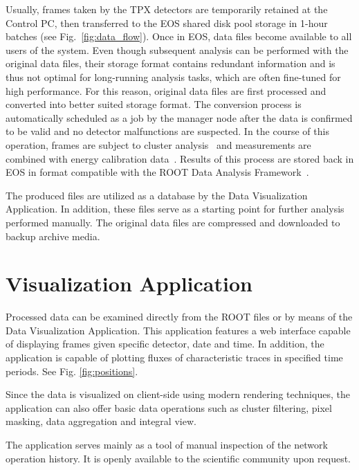 \documentclass[conference]{IEEEtran}
\begin{document}
Usually, frames taken by the TPX detectors are temporarily retained at the Control PC, then transferred to the EOS shared disk pool storage in 1-hour batches (see Fig.~\ref{fig:data_flow}). Once in EOS, data files become available to all users of the system. Even though subsequent analysis can be performed with the original data files, their storage format contains redundant information and is thus not optimal for long-running analysis tasks, which are often fine-tuned for high performance. For this reason, original data files are first processed and converted into better suited storage format. The conversion process is automatically scheduled as a job by the manager node after the data is confirmed to be valid and no detector malfunctions are suspected. In the course of this operation, frames are subject to cluster analysis~\cite{Holy2008} and measurements are combined with energy calibration data~\cite{Jakubek2011}. Results of this process are stored back in EOS in format compatible with the ROOT Data Analysis Framework~\cite{ROOT}.

The produced files are utilized as a database by the Data Visualization Application. In addition, these files serve as a starting point for further analysis performed manually. The original data files are compressed and downloaded to backup archive media.

\section{\label{sec:dal}Visualization Application}
Processed data can be examined directly from the ROOT files or by means of the Data Visualization Application. \cite{Manek2016} This application features a web interface capable of displaying frames given specific detector, date and time. In addition, the application is capable of plotting fluxes of characteristic traces in specified time periods. See Fig. \ref{fig:positions}.

Since the data is visualized on client-side using modern rendering techniques, the application can also offer basic data operations such as cluster filtering, pixel masking, data aggregation and integral view.

The application serves mainly as a tool of manual inspection of the network operation history. It is openly available to the scientific community upon request.
\end{document}
